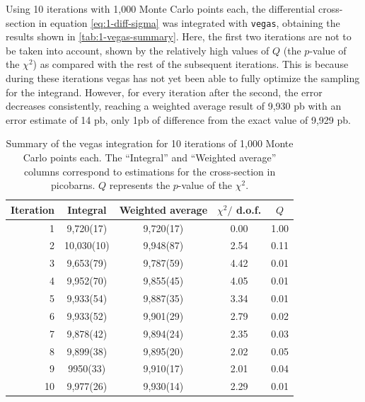 Using 10 iterations with 1,000 Monte Carlo points each, the differential cross-section in equation \eqref{eq:1-diff-sigma} was integrated with \texttt{vegas}, obtaining the results shown in \autoref{tab:1-vegas-summary}. Here, the first two iterations are not to be taken into account, shown by the relatively high values of $Q$ (the $p$-value of the $\chi^{2}$) as compared with the rest of the subsequent iterations. This is because during these iterations vegas has not yet been able to fully optimize the sampling for the integrand. However, for every iteration after the second, the error decreases consistently, reaching a weighted average result of 9,930 pb with an error estimate of 14 pb, only 1pb of difference from the exact value of 9,929 pb.

\begin{table}[ht!]
    \centering
    \renewcommand{\arraystretch}{1.2}
    \begin{tabular}{rcccc}
    \hline Iteration & Integral & Weighted average & $\chi^{2} /$ d.o.f. & $Q$ \\ \hline
    1 & 9,720(17) & 9,720(17) & 0.00 & 1.00 \\
    2 & 10,030(10) & 9,948(87) & 2.54 & 0.11 \\
    3 & 9,653(79) & 9,787(59) & 4.42 & 0.01 \\
    4 & 9,952(70) & 9,855(45) & 4.05 & 0.01 \\
    5 & 9,933(54) & 9,887(35) & 3.34 & 0.01 \\
    6 & 9,933(52) & 9,901(29) & 2.79 & 0.02 \\
    7 & 9,878(42) & 9,894(24) & 2.35 & 0.03 \\
    8 & 9,899(38) & 9,895(20) & 2.02 & 0.05 \\
    9 & 9950(33) & 9,910(17) & 2.01 & 0.04 \\
    10 & 9,977(26) & 9,930(14) & 2.29 & 0.01 \\ \hline
    \end{tabular}
    \caption{Summary of the vegas integration for 10 iterations of 1,000 Monte Carlo points each. The “Integral” and “Weighted average” columns correspond to estimations for the cross-section in picobarns. $Q$ represents the $p$-value of the $\chi^{2}$.}
    \label{tab:1-vegas-summary}
\end{table}

